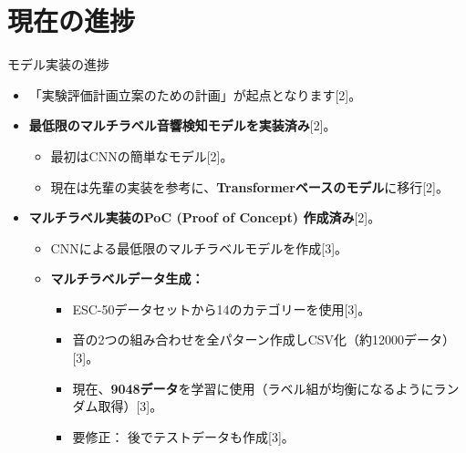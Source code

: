 \documentclass[unicode,12pt,aspectratio=169,dvipdfmx]{beamer}
\begin{document}
\section{現在の進捗} %
\begin{frame}{モデル実装の進捗} %
    \begin{itemize}
        \item 「実験評価計画立案のための計画」が起点となります[2]。
        \item \textbf{最低限のマルチラベル音響検知モデルを実装済み}[2]。
        \begin{itemize}
            \item 最初はCNNの簡単なモデル[2]。
            \item 現在は先輩の実装を参考に、\textbf{Transformerベースのモデル}に移行[2]。
        \end{itemize}
        \item \textbf{マルチラベル実装のPoC (Proof of Concept) 作成済み}[2]。
        \begin{itemize}
            \item CNNによる最低限のマルチラベルモデルを作成[3]。
            \item \textbf{マルチラベルデータ生成：}
            \begin{itemize}
                \item ESC-50データセットから14のカテゴリーを使用[3]。
                \item 音の2つの組み合わせを全パターン作成しCSV化（約12000データ）[3]。
                \item 現在、\textbf{9048データ}を学習に使用（ラベル組が均衡になるようにランダム取得）[3]。
                \item \alert{要修正：} 後でテストデータも作成[3]。
            \end{itemize}
        \end{itemize}
    \end{itemize}
\end{frame}
\end{document}
